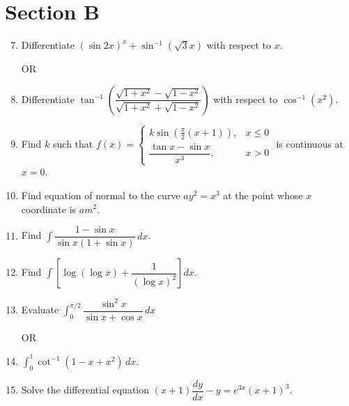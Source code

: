 \documentclass[12pt]{article}
\begin{document}
\section*{Section B}

\begin{enumerate}
    \setcounter{enumi}{6} %

    \item Differentiate $(\sin 2x)^x + \sin^{-1}(\sqrt{3}x)$ with respect to $x$.  

    OR  

    \item Differentiate $\tan^{-1}\left(\dfrac{\sqrt{1+x^2}-\sqrt{1-x^2}}{\sqrt{1+x^2}+\sqrt{1-x^2}}\right)$ with respect to $\cos^{-1}(x^2)$.

    \item Find $k$ such that $f(x)=\begin{cases} 
    k\sin\left(\tfrac{\pi}{2}(x+1)\right), & x\leq 0 \\ 
    \dfrac{\tan x-\sin x}{x^3}, & x>0 
    \end{cases}$ is continuous at $x=0$.

    \item Find equation of normal to the curve $ay^2=x^3$ at the point whose $x$ coordinate is $am^2$.

    \item Find $\int \dfrac{1-\sin x}{\sin x(1+\sin x)} \, dx$.

    \item Find $\int \left[\log(\log x)+\dfrac{1}{(\log x)^2}\right] dx$.

    \item Evaluate $\int_{0}^{\pi/2} \dfrac{\sin^2 x}{\sin x + \cos x} \, dx$  

    OR  

    \item $\int_{0}^{1} \cot^{-1}(1-x+x^2) \, dx$.

    \item Solve the differential equation $(x+1)\dfrac{dy}{dx} - y = e^{3x}(x+1)^3$.
\end{enumerate}
\end{document}
